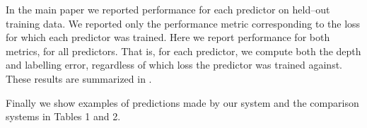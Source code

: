 In the main paper we reported performance for each predictor on
held--out training data. We reported only the performance metric
corresponding to the loss for which each predictor was trained. Here
we report performance for both metrics, for all predictors. That is,
for each predictor, we compute both the depth and labelling error,
regardless of which loss the predictor was trained against. These
results are summarized in .

Finally we show examples of predictions made by our system and the
comparison systems in Tables 1 and 2.

\begin{figure}[h]
  \centering

\\
\end{figure}
